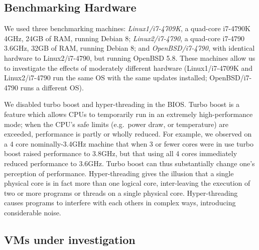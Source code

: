 \documentclass[preprint,numbers,10pt]{sigplanconf}
\newcommand{\hyptwo}{H2\xspace}
\newcommand{\bencherthree}{Linux1/i7-4709K\xspace}
\newcommand{\bencherfive}{Linux2/i7-4790\xspace}
\newcommand{\benchersix}{OpenBSD/i7-4790\xspace}
\begin{document}
\subsection{Benchmarking Hardware}

We used three benchmarking machines: \emph{\bencherthree}, a quad-core i7-4790K
4GHz, 24GB of RAM, running Debian 8; \emph{\bencherfive}, a quad-core i7-4790
3.6GHz, 32GB of RAM, running Debian 8; and \emph{\benchersix}, with identical
hardware to \bencherfive, but running OpenBSD 5.8. These machines allow us to
investigate the effects of moderately different hardware (\bencherthree and
\bencherfive run the same OS with the same updates installed; \benchersix runs a
different OS).

We disabled turbo boost and hyper-threading in the BIOS. Turbo boost is a
feature which allows CPUs to temporarily run in an extremely high-performance
mode; when the CPU's safe limits (e.g.~power draw, or temperature) are exceeded,
performance is partly or wholly reduced. For example, we observed on a 4 core
nominally-3.4GHz machine that when 3 or fewer cores were in use turbo boost
raised performance to 3.8GHz, but that using all 4 cores immediately reduced
performance to 3.6GHz. Turbo boost can thus substantially change one's
perception of performance. Hyper-threading gives the illusion that a single
physical core is in fact more than one logical core, inter-leaving the
execution of two or more programs or threads on a single physical core.
Hyper-threading causes programs to interfere
with each others in complex ways, introducing considerable noise.


\subsection{VMs under investigation}
\end{document}
